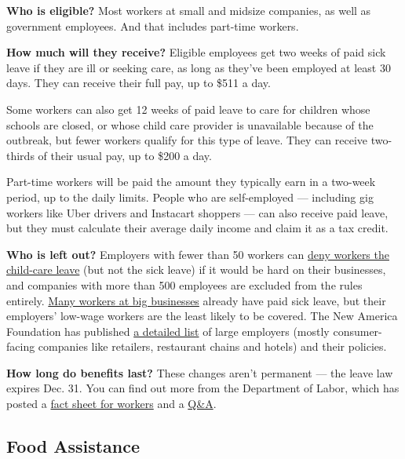 \textbf{Who is eligible?} Most workers at small and midsize companies,
as well as government employees. And that includes part-time workers.

\textbf{How much will they receive?} Eligible employees get two weeks of
paid sick leave if they are ill or seeking care, as long as they've been
employed at least 30 days. They can receive their full pay, up to \$511
a day.

Some workers can also get 12 weeks of paid leave to care for children
whose schools are closed, or whose child care provider is unavailable
because of the outbreak, but fewer workers qualify for this type of
leave. They can receive two-thirds of their usual pay, up to \$200 a
day.

Part-time workers will be paid the amount they typically earn in a
two-week period, up to the daily limits. People who are self-employed
--- including gig workers like Uber drivers and Instacart shoppers ---
can also receive paid leave, but they must calculate their average daily
income and claim it as a tax credit.

\textbf{Who is left out?} Employers with fewer than 50 workers can
\href{https://www.nytimes.com/2020/04/02/us/politics/coronavirus-paid-leave.html}{deny
workers the child-care leave} (but not the sick leave) if it would be
hard on their businesses, and companies with more than 500 employees are
excluded from the rules entirely.
\href{https://www.bls.gov/ncs/ebs/benefits/2019/ownership/private/table31a.pdf}{Many
workers at big businesses} already have paid sick leave, but their
employers' low-wage workers are the least likely to be covered. The New
America Foundation has published
\href{https://www.newamerica.org/better-life-lab/reports/which-companies-still-arent-offering-paid-sick-days/}{a
detailed list} of large employers (mostly consumer-facing companies like
retailers, restaurant chains and hotels) and their policies.

\textbf{How long do benefits last?} These changes aren't permanent ---
the leave law expires Dec. 31. You can find out more from the Department
of Labor, which has posted a
\href{https://www.dol.gov/agencies/whd/pandemic/ffcra-employee-paid-leave}{fact
sheet for workers} and a
\href{https://www.dol.gov/agencies/whd/pandemic/ffcra-questions}{Q\&A}.

\hypertarget{food-assistance}{%
\subsection{Food Assistance}\label{food-assistance}}

